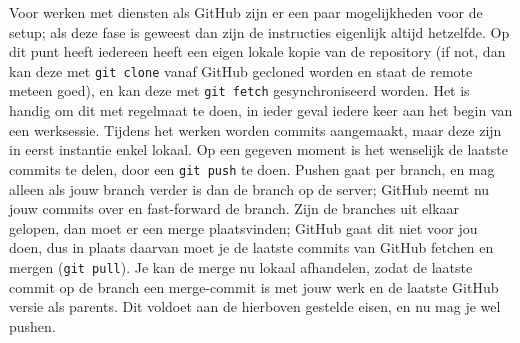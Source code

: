 Voor werken met diensten als GitHub zijn er een paar mogelijkheden voor de setup; als deze fase is geweest dan zijn de instructies eigenlijk altijd hetzelfde. Op dit punt heeft iedereen heeft een eigen lokale kopie van de repository (if not, dan kan deze met \texttt{git clone} vanaf GitHub gecloned worden en staat de remote meteen goed), en kan deze met \texttt{git fetch} gesynchroniseerd worden. Het is handig om dit met regelmaat te doen, in ieder geval iedere keer aan het begin van een werksessie. Tijdens het werken worden commits aangemaakt, maar deze zijn in eerst instantie enkel lokaal. Op een gegeven moment is het wenselijk de laatste commits te delen, door een \texttt{git push} te doen. Pushen gaat per branch, en mag alleen als jouw branch verder is dan de branch op de server; GitHub neemt nu jouw commits over en fast-forward de branch. Zijn de branches uit elkaar gelopen, dan moet er een merge plaatsvinden; GitHub gaat dit niet voor jou doen, dus in plaats daarvan moet je de laatste commits van GitHub fetchen en mergen (\texttt{git pull}). Je kan de merge nu lokaal afhandelen, zodat de laatste commit op de branch een merge-commit is met jouw werk en de laatste GitHub versie als parents. Dit voldoet aan de hierboven gestelde eisen, en nu mag je wel pushen.

